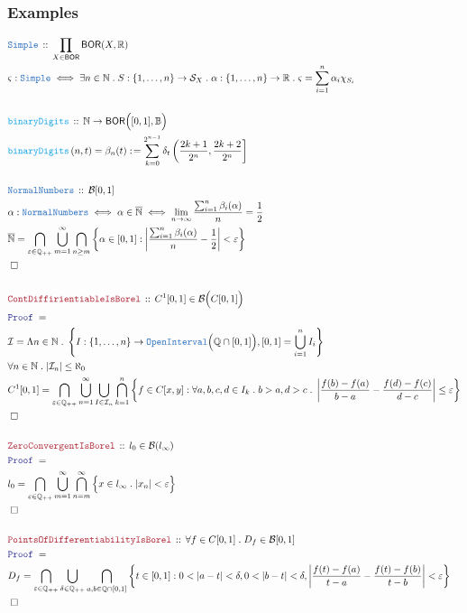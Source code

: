 \documentclass[12pt]{scrartcl}
\newcommand{\TYPE}[1]{\textcolor{NavyBlue}{\mathtt{#1}}}
\newcommand{\FUNC}[1]{\textcolor{Cerulean}{\mathtt{#1}}}
\newcommand{\LOGIC}[1]{\textcolor{Blue}{\mathtt{#1}}}
\newcommand{\THM}[1]{\textcolor{Maroon}{\mathtt{#1}}}
\renewcommand{\.}{\; . \;}
\newcommand{\de}{: \kern 0.1pc =}
\newcommand{\Act}[1]{\left( #1 \right)}
\newcommand{\Theorem}[2]{& \THM{#1} \, :: \, #2 \\ & \Proof = \\ }
\newcommand{\DeclareType}[2]{& \TYPE{#1} \, :: \, #2 \\}
\newcommand{\DefineType}[3]{& #1 : \TYPE{#2} \iff #3 \\}
\newcommand{\DefineNamedType}[4]{& #1 : \TYPE{#2} \iff #3 \iff #4 \\}
\newcommand{\DeclareFunc}[2]{& \FUNC{#1} \, :: \, #2 \\}
\newcommand{\DefineNamedFunc}[4]{&  \FUNC{#1}\Act{#2} = #3 \de #4 \\}
\newcommand{\Page}[1]{ \begin{align*} #1 \end{align*}   }
\newcommand{\Reals}{\mathbb{R} }
\newcommand{\Rats}{\mathbb{Q} }
\newcommand{\Nat}{\mathbb{N} }
\newcommand{\QED}{\; \square}
\newcommand{\EndProof}{& \QED \\}
\newcommand{\Proof}{\LOGIC{Proof} \; }
\newcommand{\B}{\mathcal{B}}
\newcommand{\I}{\mathcal{I}}
\newcommand{\Bool}{\mathbb{B}}
\newcommand{\BOR}{\mathsf{BOR}}
\renewcommand{\S}{\mathcal{S}}
\begin{document}
\subsubsection{Examples}
\Page{
	\DeclareType{Simple}{\prod_{X \in \BOR} \BOR(X,\Reals)}
	\DefineType{\varsigma}{Simple}
	{
		\exists n \in \Nat \. 
		S : \{1,\ldots,n\} \to \S_X \.
		\alpha : \{1,\ldots,n\} \to  \Reals \.
		\varsigma = \sum^n_{i=1} \alpha_i \chi_{S_i}
	}
	\\
	\DeclareFunc{binaryDigits}{\Nat \to \BOR\Big([0,1], \Bool\Big)}
	\DefineNamedFunc{binaryDigits}{n,t}{\beta_n(t)}{
		\sum^{2^{n-1}}_{k=0}  \delta_t \left( \frac{2k+1}{2^n}, \frac{2k+2}{2^n} \right]
	} 
	\\
	\DeclareType{NormalNumbers}{\B[0,1]}
	\DefineNamedType{\alpha}{NormalNumbers}{\alpha \in \overline{\Nat}}
	{
		\lim_{n \to \infty} \frac{\sum^n_{i=1} \beta_i(\alpha)}{n} = \frac{1}{2}
	}
	& \overline{\Nat} = 
		\bigcap_{\varepsilon \in \Rats_{++}}
		\bigcup^\infty_{m=1}
		\bigcap_{n \ge m} \left\{ \alpha \in [0,1] : 
		\left| \frac{\sum^n_{i=1} \beta_i(\alpha)}{n} - \frac{1}{2} \right| < \varepsilon  
		\right\}  \\
	\EndProof
	\\
	\Theorem{ContDiffirientiableIsBorel}
	{
		C^1[0,1] \in \B\Big( C[0,1]\Big)
	}
	& \mathcal{I} = \Lambda n \in \Nat \. 
	\left\{
		I :  \{1,\ldots,n\} \to \TYPE{OpenInterval}\Big( \Rats \cap [0,1] \Big), 
		[0,1] = \bigcup^n_{i=1} I_i
	\right\} \\
	&  \forall n \in \Nat \. |\I_n| \le \aleph_0     \\
	&
		C^1[0,1] = 
		\bigcap_{\varepsilon \in \Rats_{++}}
		\bigcup^\infty_{n=1}
		\bigcup_{I \in \I_n}
		\bigcap^n_{k=1}
		\left\{                                                 
				f \in C[x,y] : 
				\forall a,b,c,d \in  I_k \.
				b > a, d > c \.
				\left|
					\frac{f(b) - f(a)}{b - a} - \frac{f(d) - f(c)}{d - c}
				\right|   \le \varepsilon
		\right\}
	\\
	\EndProof
	\\
	\Theorem{ZeroConvergentIsBorel}
	{
		l_0 \in \B(l_\infty)
	}
	&
		l_0 = 
		\bigcap_{\varepsilon \in \Rats_{++}}
		\bigcup^\infty_{m=1}
		\bigcap^\infty_{n=m}
		\Big\{                                                 
				x \in l_\infty \.  |x_n| < \varepsilon
		\Big\}
	\\
	\EndProof
	\\
	\Theorem{PointsOfDifferentiabilityIsBorel}
	{
		\forall f \in C[0,1] \. 
		D_f \in \B[0,1]
	}
	&
		D_f = 
		\bigcap_{\varepsilon \in \Rats_{++}}
		\bigcup_{\delta \in \Rats_{++}}
		\bigcap_{a,b \in \Rats \cap [0,1]}
		\left\{                                                 
				t \in [0,1]  :  
				0<  |a -t| < \delta, 
				0 < |b -t| < \delta,
				\left|
					\frac{f(t) - f(a)}{t - a}
					-
					\frac{f(t) - f(b)}{t - b}
				\right| 
				<
				\varepsilon 
		\right\}
	\\
	\EndProof
}
\newpage
\end{document}
